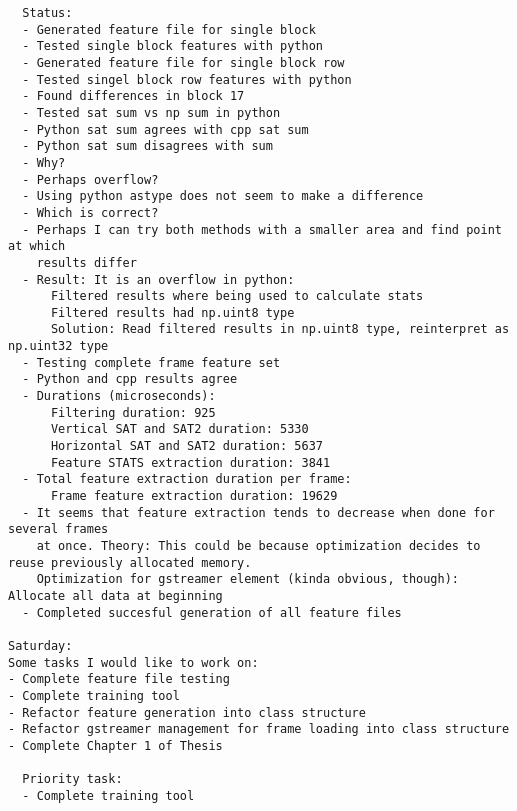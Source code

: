 \documentclass[12pt,oneside]{book}
\begin{document}
\begin{lstlisting}
  Status:
  - Generated feature file for single block
  - Tested single block features with python
  - Generated feature file for single block row
  - Tested singel block row features with python
  - Found differences in block 17
  - Tested sat sum vs np sum in python
  - Python sat sum agrees with cpp sat sum
  - Python sat sum disagrees with sum
  - Why?
  - Perhaps overflow?
  - Using python astype does not seem to make a difference
  - Which is correct?
  - Perhaps I can try both methods with a smaller area and find point at which
    results differ
  - Result: It is an overflow in python:
      Filtered results where being used to calculate stats
      Filtered results had np.uint8 type
      Solution: Read filtered results in np.uint8 type, reinterpret as np.uint32 type
  - Testing complete frame feature set
  - Python and cpp results agree
  - Durations (microseconds):
      Filtering duration: 925
      Vertical SAT and SAT2 duration: 5330
      Horizontal SAT and SAT2 duration: 5637
      Feature STATS extraction duration: 3841
  - Total feature extraction duration per frame:
      Frame feature extraction duration: 19629
  - It seems that feature extraction tends to decrease when done for several frames
    at once. Theory: This could be because optimization decides to reuse previously allocated memory.
    Optimization for gstreamer element (kinda obvious, though): Allocate all data at beginning
  - Completed succesful generation of all feature files

Saturday:
Some tasks I would like to work on:
- Complete feature file testing
- Complete training tool
- Refactor feature generation into class structure
- Refactor gstreamer management for frame loading into class structure
- Complete Chapter 1 of Thesis

  Priority task:
  - Complete training tool


\end{lstlisting}
\end{document}
